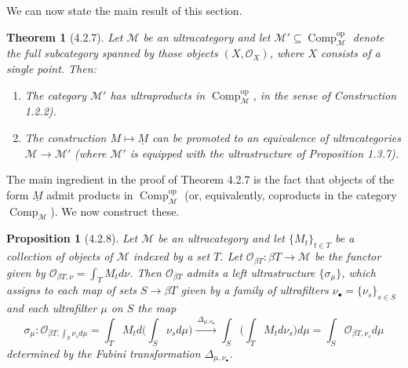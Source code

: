 \documentclass[11pt]{article}
\theoremstyle{plain}
\newtheorem{theorem}{Theorem}
\newtheorem{proposition}{Proposition}
\theoremstyle{definition}
\newcommand{\Comp}{\operatorname{Comp}}
\begin{document}
We can now state the main result of this section.

\begin{theorem}[4.2.7]
Let $\mathcal{M}$ be an ultracategory and let $\mathcal{M}' \subseteq \Comp^{\mathrm{op}}_{\mathcal{M}}$ denote the full subcategory spanned by those objects $(X, \mathcal{O}_X)$, where $X$ consists of a single point. Then:
\begin{enumerate}
\item[(a)] The category $\mathcal{M}'$ has ultraproducts in $\Comp^{\mathrm{op}}_{\mathcal{M}}$, in the sense of Construction 1.2.2).
\item[(b)] The construction $M \mapsto \underline{M}$ can be promoted to an equivalence of ultracategories $\mathcal{M} \to \mathcal{M}'$ (where $\mathcal{M}'$ is equipped with the ultrastructure of Proposition 1.3.7).
\end{enumerate}
\end{theorem}

The main ingredient in the proof of Theorem 4.2.7 is the fact that objects of the form $\underline{M}$ admit products in $\Comp^{\mathrm{op}}_{\mathcal{M}}$ (or, equivalently, coproducts in the category $\Comp_{\mathcal{M}}$). We now construct these.

\begin{proposition}[4.2.8]
Let $\mathcal{M}$ be an ultracategory and let $\{M_t\}_{t \in T}$ be a collection of objects of $\mathcal{M}$ indexed by a set $T$. Let $\mathcal{O}_{\beta T} : \beta T \to \mathcal{M}$ be the functor given by $\mathcal{O}_{\beta T, \nu} = \int_T M_t d\nu$. Then $\mathcal{O}_{\beta T}$ admits a left ultrastructure $\{\sigma_\mu\}$, which assigns to each map of sets $S \to \beta T$ given by a family of ultrafilters $\nu_\bullet = \{\nu_s\}_{s \in S}$ and each ultrafilter $\mu$ on $S$ the map
\[
\sigma_\mu : \mathcal{O}_{\beta T, \int_S \nu_s d\mu} = \int_T M_t d\Big(\int_S \nu_s d\mu\Big) \xrightarrow{\ \Delta_{\mu, \nu_\bullet}\ } \int_S \Big(\int_T M_t d\nu_s\Big) d\mu = \int_S \mathcal{O}_{\beta T, \nu_s} d\mu
\]
determined by the \emph{Fubini transformation} $\Delta_{\mu, \nu_\bullet}$.
\end{proposition}
\end{document}
